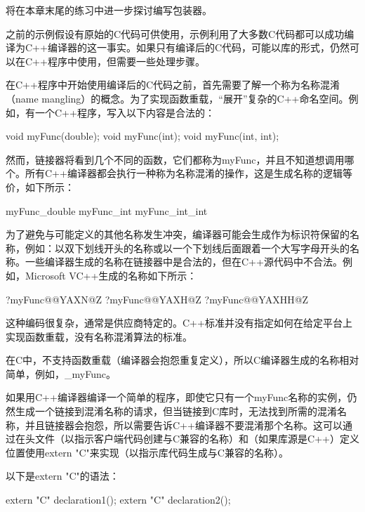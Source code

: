 将在本章末尾的练习中进一步探讨编写包装器。


之前的示例假设有原始的C代码可供使用，示例利用了大多数C代码都可以成功编译为C++编译器的这一事实。如果只有编译后的C代码，可能以库的形式，仍然可以在C++程序中使用，但需要一些处理步骤。

在C++程序中开始使用编译后的C代码之前，首先需要了解一个称为名称混淆（name mangling）的概念。为了实现函数重载，“展开”复杂的C++命名空间。例如，有一个C++程序，写入以下内容是合法的：

\begin{cpp}
void myFunc(double);
void myFunc(int);
void myFunc(int, int);
\end{cpp}

然而，链接器将看到几个不同的函数，它们都称为myFunc，并且不知道想调用哪个。所有C++编译器都会执行一种称为名称混淆的操作，这是生成名称的逻辑等价，如下所示：

\begin{shell}
myFunc_double
myFunc_int
myFunc_int_int
\end{shell}

为了避免与可能定义的其他名称发生冲突，编译器可能会生成作为标识符保留的名称，例如：以双下划线开头的名称或以一个下划线后面跟着一个大写字母开头的名称。一些编译器生成的名称在链接器中是合法的，但在C++源代码中不合法。例如，Microsoft VC++生成的名称如下所示：

\begin{shell}
?myFunc@@YAXN@Z
?myFunc@@YAXH@Z
?myFunc@@YAXHH@Z
\end{shell}

这种编码很复杂，通常是供应商特定的。C++标准并没有指定如何在给定平台上实现函数重载，没有名称混淆算法的标准。

在C中，不支持函数重载（编译器会抱怨重复定义），所以C编译器生成的名称相对简单，例如，\_myFunc。

如果用C++编译器编译一个简单的程序，即使它只有一个myFunc名称的实例，仍然生成一个链接到混淆名称的请求，但当链接到C库时，无法找到所需的混淆名称，并且链接器会抱怨，所以需要告诉C++编译器不要混淆那个名称。这可以通过在头文件（以指示客户端代码创建与C兼容的名称）和（如果库源是C++）定义位置使用extern "C"来实现（以指示库代码生成与C兼容的名称）。

以下是extern "C"的语法：

\begin{cpp}
extern "C" declaration1();
extern "C" declaration2();
\end{cpp}

